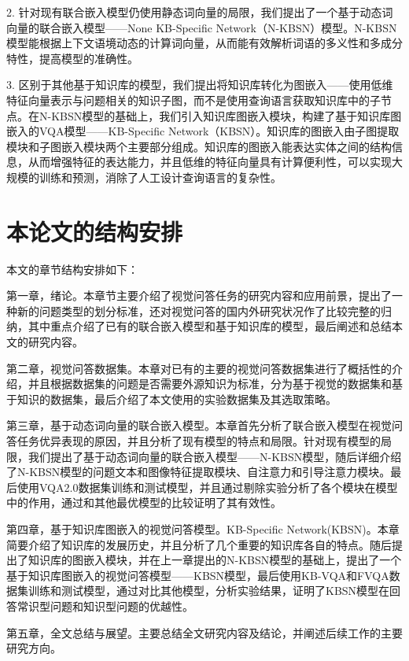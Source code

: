 2. 针对现有联合嵌入模型仍使用静态词向量的局限，我们提出了一个基于动态词向量的联合嵌入模型——None KB-Specific Network（N-KBSN）模型。N-KBSN模型能根据上下文语境动态的计算词向量，从而能有效解析词语的多义性和多成分特性，提高模型的准确性。

3. 区别于其他基于知识库的模型，我们提出将知识库转化为图嵌入——使用低维特征向量表示与问题相关的知识子图，而不是使用查询语言获取知识库中的子节点。在N-KBSN模型的基础上，我们引入知识库图嵌入模块，构建了基于知识库图嵌入的VQA模型——KB-Specific Network（KBSN）。知识库的图嵌入由子图提取模块和子图嵌入模块两个主要部分组成。知识库的图嵌入能表达实体之间的结构信息，从而增强特征的表达能力，并且低维的特征向量具有计算便利性，可以实现大规模的训练和预测，消除了人工设计查询语言的复杂性。

\section{本论文的结构安排}
本文的章节结构安排如下：

第一章，绪论。本章节主要介绍了视觉问答任务的研究内容和应用前景，提出了一种新的问题类型的划分标准，还对视觉问答的国内外研究状况作了比较完整的归纳，其中重点介绍了已有的联合嵌入模型和基于知识库的模型，最后阐述和总结本文的研究内容。

第二章，视觉问答数据集。本章对已有的主要的视觉问答数据集进行了概括性的介绍，并且根据数据集的问题是否需要外源知识为标准，分为基于视觉的数据集和基于知识的数据集，最后介绍了本文使用的实验数据集及其选取策略。

第三章，基于动态词向量的联合嵌入模型。本章首先分析了联合嵌入模型在视觉问答任务优异表现的原因，并且分析了现有模型的特点和局限。针对现有模型的局限，我们提出了基于动态词向量的联合嵌入模型——N-KBSN模型，随后详细介绍了N-KBSN模型的问题文本和图像特征提取模块、自注意力和引导注意力模块。最后使用VQA2.0数据集训练和测试模型，并且通过剔除实验分析了各个模块在模型中的作用，通过和其他最优模型的比较证明了其有效性。

第四章，基于知识库图嵌入的视觉问答模型。KB-Specific Network(KBSN)。本章简要介绍了知识库的发展历史，并且分析了几个重要的知识库各自的特点。随后提出了知识库的图嵌入模块，并在上一章提出的N-KBSN模型的基础上，提出了一个基于知识库图嵌入的视觉问答模型——KBSN模型，最后使用KB-VQA和FVQA数据集训练和测试模型，通过对比其他模型，分析实验结果，证明了KBSN模型在回答常识型问题和知识型问题的优越性。

第五章，全文总结与展望。主要总结全文研究内容及结论，并阐述后续工作的主要研究方向。


